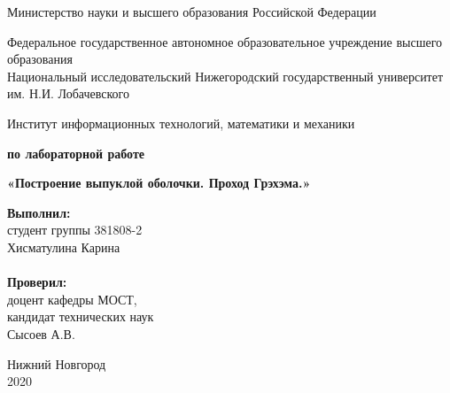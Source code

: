 \documentclass{report}
\begin{document}
\begin{titlepage}

\begin{center}
Министерство науки и высшего образования Российской Федерации
\end{center}

\begin{center}
Федеральное государственное автономное образовательное учреждение высшего образования \\
Национальный исследовательский Нижегородский государственный университет им. Н.И. Лобачевского
\end{center}

\begin{center}
Институт информационных технологий, математики и механики
\end{center}

\vspace{4em}

\begin{center}
\textbf{ по лабораторной работе} \\
\end{center}
\begin{center}
\textbf{\Large«Построение выпуклой оболочки. Проход Грэхэма.»} \\
\end{center}

\vspace{4em}

\newbox{\lbox}
\newlength{\maxl}
\setlength{\maxl}{\wd\lbox}
\hfill\parbox{7cm}{
\hspace*{5cm}\hspace*{-5cm}\textbf{Выполнил:} \\ студент группы 381808-2 \\ Хисматулина Карина\\
\\
\hspace*{5cm}\hspace*{-5cm}\textbf{Проверил:}\\ доцент кафедры МОСТ, \\ кандидат технических наук \\ Сысоев А.В.\\
}
\vspace{\fill}

\begin{center} Нижний Новгород \\ 2020 \end{center}

\end{titlepage}
\end{document}
